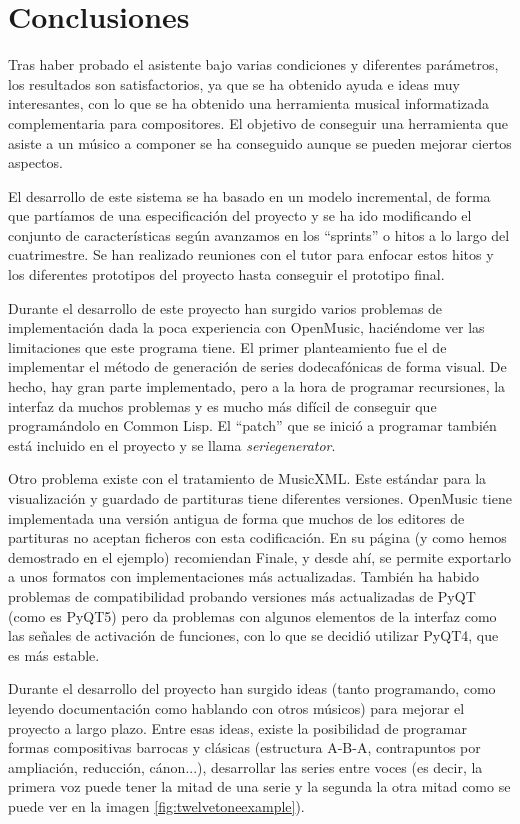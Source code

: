 \documentclass[a4paper,openany,oneside,12pt]{book}
\begin{document}
\chapter{Conclusiones}\label{conclusiones}
Tras haber probado el asistente bajo varias condiciones y diferentes parámetros, los resultados son satisfactorios, ya que se ha obtenido ayuda e ideas muy interesantes, con lo que se ha obtenido una herramienta musical informatizada complementaria para compositores. El objetivo de conseguir una herramienta que asiste a un músico a componer se ha conseguido aunque se pueden mejorar ciertos aspectos.

El desarrollo de este sistema se ha basado en un modelo incremental, de forma que partíamos de una especificación del proyecto y se ha ido modificando el conjunto de características según avanzamos en los ``sprints'' o hitos a lo largo del cuatrimestre. Se han realizado reuniones con el tutor para enfocar estos hitos y los diferentes prototipos del proyecto hasta conseguir el prototipo final.

Durante el desarrollo de este proyecto han surgido varios problemas de implementación dada la poca experiencia con OpenMusic, haciéndome ver las limitaciones que este programa tiene. El primer planteamiento fue el de implementar el método de generación de series dodecafónicas de forma visual. De hecho, hay gran parte implementado, pero a la hora de programar recursiones, la interfaz da muchos problemas y es mucho más difícil de conseguir que programándolo en Common Lisp. El ``patch'' que se inició a programar también está incluido en el proyecto y se llama \emph{seriegenerator}.

Otro problema existe con el tratamiento de MusicXML. Este estándar para la visualización y guardado de partituras tiene diferentes versiones. OpenMusic tiene implementada una versión antigua de forma que muchos de los editores de partituras no aceptan ficheros con esta codificación. En su página (y como hemos demostrado en el ejemplo) recomiendan Finale, y desde ahí, se permite exportarlo a unos formatos con implementaciones más actualizadas. También ha habido problemas de compatibilidad probando versiones más actualizadas de PyQT (como es PyQT5) pero da problemas con algunos elementos de la interfaz como las señales de activación de funciones, con lo que se decidió utilizar PyQT4, que es más estable.

Durante el desarrollo del proyecto han surgido ideas (tanto programando, como leyendo documentación como hablando con otros músicos) para mejorar el proyecto a largo plazo. Entre esas ideas, existe la posibilidad de programar formas compositivas barrocas y clásicas (estructura A-B-A, contrapuntos por ampliación, reducción, cánon...), desarrollar las series entre voces (es decir, la primera voz puede tener la mitad de una serie y la segunda la otra mitad como se puede ver en la imagen \ref{fig:twelvetoneexample}).
\end{document}
